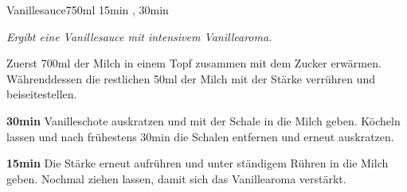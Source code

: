 \documentclass[../recipe-collections/cooking.tex]{subfiles}
\begin{document}
\begin{recipe}{Vanillesauce}{750ml }{15min , 30min }

  \freeform{}\textit{Ergibt eine Vanillesauce mit intensivem Vanillearoma.}


  Zuerst 700ml der Milch in einem Topf zusammen mit dem Zucker erwärmen.
  Währenddessen die restlichen 50ml der Milch mit der Stärke verrühren und beiseitestellen.

  \newstep{}\textbf{30min}
  Vanilleschote auskratzen und mit der Schale in die Milch geben.
  Köcheln lassen und nach frühestens 30min die Schalen entfernen und erneut auskratzen.

  \newstep{}\textbf{15min}
  Die Stärke erneut aufrühren und unter ständigem Rühren in die Milch geben.
  Nochmal ziehen lassen, damit sich das Vanillearoma verstärkt.

  \freeform{}\hrulefill{}

\end{recipe}
\end{document}
